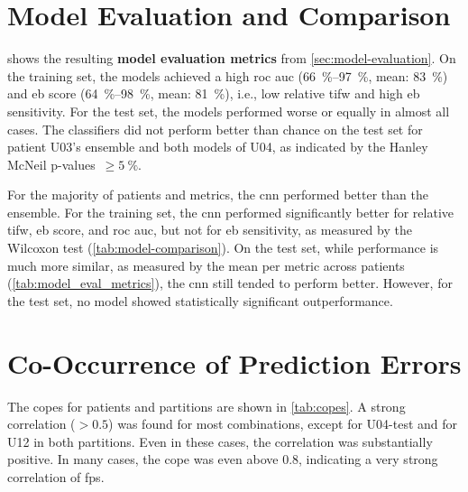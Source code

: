 \section{Model Evaluation and Comparison} \label{sec:model-eval-and-comparison}
 shows the resulting \textbf{model evaluation metrics} from \cref{sec:model-evaluation}.
On the training set, the models achieved a high \gls{roc auc} (\SIrange{66}{97}{\percent}, mean: \SI{83}{\percent}) and \gls{eb} score (\SIrange{64}{98}{\percent}, mean: \SI{81}{\percent}), i.e., low relative \gls{tifw} and high \gls{eb} sensitivity.
For the test set, the models performed worse or equally in almost all cases.
The classifiers did not perform better than chance on the test set for patient U03's ensemble and both models of U04, as indicated by the Hanley McNeil p-values~$\geq\SI{5}{\percent}$.

For the majority of patients and metrics, the \gls{cnn} performed better than the ensemble.
For the training set, the \gls{cnn} performed significantly better for relative \gls{tifw}, \gls{eb} score, and \gls{roc auc}, but not for \gls{eb} sensitivity, as measured by the Wilcoxon test (\cref{tab:model-comparison}).
On the test set, while performance is much more similar, as measured by the mean per metric across patients (\cref{tab:model_eval_metrics}), the \gls{cnn} still tended to perform better.
However, for the test set, no model showed statistically significant outperformance.

\begin{table}[!htb]
    \centering
    \caption{Model Comparison.\\Results of the Wilcoxon Test between the Evaluation Metrics of the Ensemble and CNN}
    \label{tab:model-comparison}
    
\end{table}

\section{Co-Occurrence of Prediction Errors}\label{sec:results-co-occurrence-of-prediction-errors}
The \glspl{cope} for patients and partitions are shown in \cref{tab:copes}.
A strong correlation ($>0.5$) was found for most combinations, except for U04-test and for U12 in both partitions.
Even in these cases, the correlation was substantially positive.
In many cases, the \gls{cope} was even above \num{0.8}, indicating a very strong correlation of \glspl{fp}.

